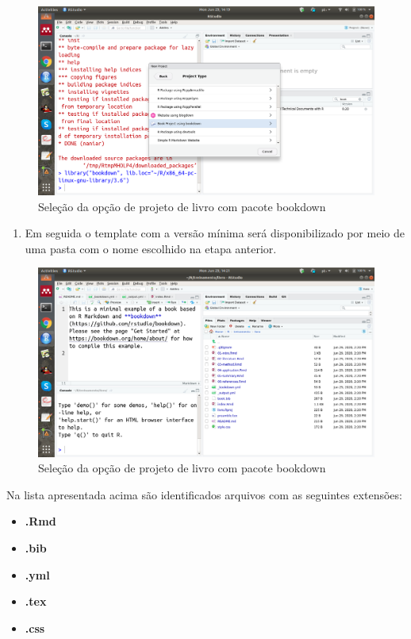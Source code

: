 \documentclass[
]{book}
\providecommand{\tightlist}{%
  \setlength{\itemsep}{0pt}\setlength{\parskip}{0pt}}
\begin{document}
\begin{figure}
\centering
\includegraphics{fig/select_Book_Project_with_bookdown.png}
\caption{Seleção da opção de projeto de livro com pacote bookdown}
\end{figure}

\begin{enumerate}
\def\labelenumi{\arabic{enumi}.}
\setcounter{enumi}{3}
\tightlist
\item
  Em seguida o template com a versão mínima será
  disponibilizado por meio de uma pasta com o nome escolhido na etapa anterior.
\end{enumerate}

\begin{figure}
\centering
\includegraphics{fig/outra.png}
\caption{Seleção da opção de projeto de livro com pacote bookdown}
\end{figure}

Na lista apresentada acima são identificados
arquivos com as seguintes extensões:

\begin{itemize}
\tightlist
\item
  \textbf{.Rmd}
\item
  \textbf{.bib}
\item
  \textbf{.yml}
\item
  \textbf{.tex}
\item
  \textbf{.css}
\end{itemize}
\end{document}
